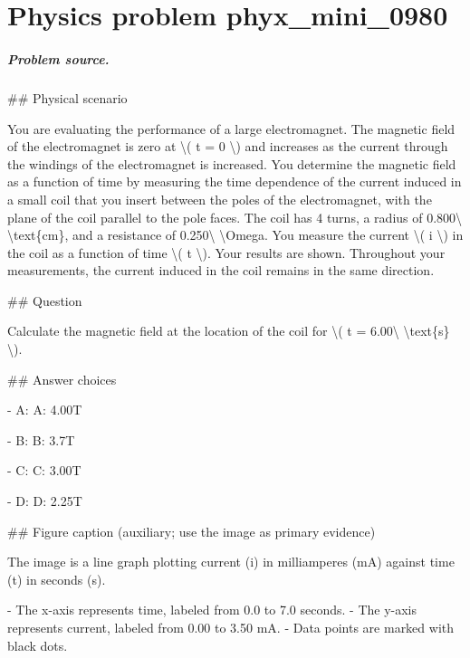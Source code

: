 
\chapter{Physics problem phyx\_mini\_0980}
\label{ch:PhyXMiniProblems_problem_phyx_mini_0980}

\paragraph{Problem source.}
\#\# Physical scenario

You are evaluating the performance of a large electromagnet. The magnetic field of the electromagnet is zero at \textbackslash{}( t = 0 \textbackslash{}) and increases as the current through the windings of the electromagnet is increased. You determine the magnetic field as a function of time by measuring the time dependence of the current induced in a small coil that you insert between the poles of the electromagnet, with the plane of the coil parallel to the pole faces. The coil has 4 turns, a radius of 0.800\textbackslash{} \textbackslash{}text\{cm\}, and a resistance of 0.250\textbackslash{} \textbackslash{}Omega. You measure the current \textbackslash{}( i \textbackslash{}) in the coil as a function of time \textbackslash{}( t \textbackslash{}). Your results are shown. Throughout your measurements, the current induced in the coil remains in the same direction.

\#\# Question

Calculate the magnetic field at the location of the coil for \textbackslash{}( t = 6.00\textbackslash{} \textbackslash{}text\{s\} \textbackslash{}).

\#\# Answer choices

- A: A: 4.00T

- B: B: 3.7T

- C: C: 3.00T

- D: D: 2.25T

\#\# Figure caption (auxiliary; use the image as primary evidence)

The image is a line graph plotting current (i) in milliamperes (mA) against time (t) in seconds (s). 

- The x-axis represents time, labeled from 0.0 to 7.0 seconds.
- The y-axis represents current, labeled from 0.00 to 3.50 mA.
- Data points are marked with black dots.

